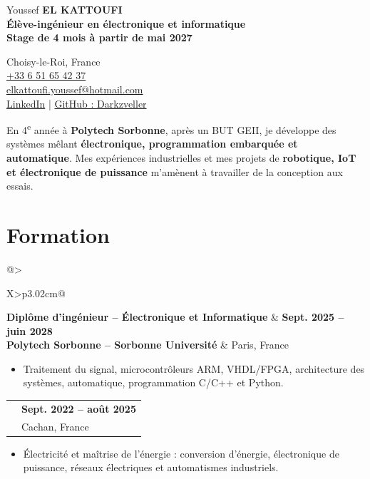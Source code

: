 \documentclass[10pt,a4paper]{article}
\makeatletter
\newcommand{\cventry}[4]{%
  \noindent\begin{tabularx}{\linewidth}{@{}>{\raggedright\arraybackslash}X>{\raggedleft\arraybackslash}p{3.02cm}@{}}
    {\color{vert}\bfseries #1} & {\bfseries\small #2} \\[-1.2pt]
    {\color{bleu}\bfseries #3} & {\small #4}
  \end{tabularx}\vspace{-4pt}\par
}
\newcommand{\itemgap}{\vspace{1.5pt}}
\newcommand{\objectif}{Stage de 4 mois à partir de mai 2027}
\makeatother
\begin{document}
\begin{minipage}[t]{0.61\linewidth}
  {\fontsize{22}{24}\selectfont Youssef \textbf{EL KATTOUFI}}\\[3pt]
  {\fontsize{12.0}{14}\selectfont\color{marine}\bfseries
  Élève-ingénieur en électronique et informatique}\\[2pt]
  {\fontsize{10.3}{12.2}\selectfont\color{marine}\bfseries \objectif}
\end{minipage}\hfill
\begin{minipage}[t]{0.375\linewidth}\raggedleft\fontsize{9.3}{10.8}\selectfont
  Choisy-le-Roi, France\\
  \href{tel:+33651654237}{+33 6 51 65 42 37}\\
  \href{mailto:elkattoufi.youssef@hotmail.com}{elkattoufi.youssef@hotmail.com}\\
  \href{https://www.linkedin.com/in/youssef-el-kattoufi-5a04a0282/}{LinkedIn} \enspace | \enspace
  \href{https://github.com/Darkzveller}{GitHub : Darkzveller}
\end{minipage}

\vspace{5pt}
{\fontsize{9.8}{11.4}\selectfont\justifying
En 4\textsuperscript{e} année à \textbf{Polytech Sorbonne}, après un BUT GEII, je développe des systèmes mêlant \textbf{électronique, programmation embarquée et automatique}. Mes expériences industrielles et mes projets de \textbf{robotique, IoT et électronique de puissance} m'amènent à travailler de la conception aux essais.\par}

\section{Formation}
\cventry{Diplôme d'ingénieur -- Électronique et Informatique}{Sept. 2025 -- juin 2028}{Polytech Sorbonne -- Sorbonne Université}{Paris, France}
\begin{itemize}
  \item Traitement du signal, microcontrôleurs ARM, VHDL/FPGA, architecture des systèmes, automatique, programmation C/C++ et Python.
\end{itemize}
\itemgap
\cventry{BUT Génie électrique et informatique industrielle -- parcours EME}{Sept. 2022 -- août 2025}{IUT de Cachan -- Université Paris-Saclay}{Cachan, France}
\begin{itemize}
  \item Électricité et maîtrise de l'énergie : conversion d'énergie, électronique de puissance, réseaux électriques et automatismes industriels.
\end{itemize}
\end{document}
